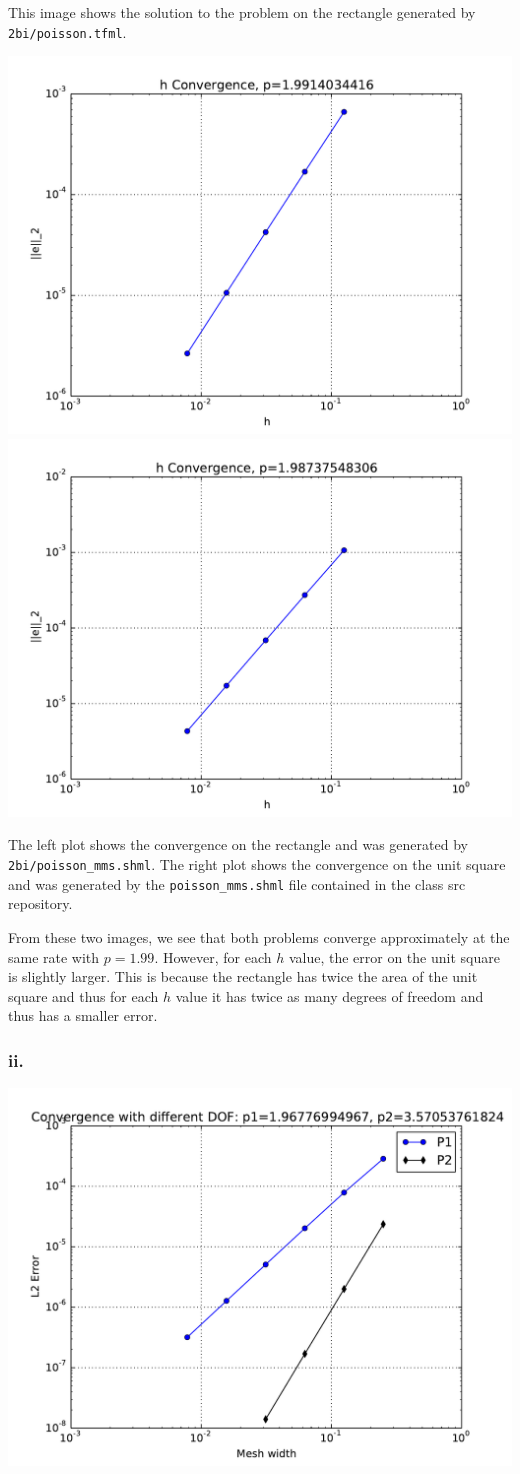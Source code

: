 \documentclass{article}
\begin{document}
This image shows the solution to the problem on the rectangle generated by \verb|2bi/poisson.tfml|.

\includegraphics[width=.5\linewidth]{2biConvergence.pdf}
\includegraphics[width=.5\linewidth]{2biConvergenceSquare.pdf}

The left plot shows the convergence on the rectangle and was generated by \verb|2bi/poisson_mms.shml|. The right plot shows the convergence on the unit square and was generated by the \verb|poisson_mms.shml| file contained in the class src repository.

From these two images, we see that both problems converge approximately at the same rate with $p=1.99$. However, for each $h$ value, the error on the unit square is slightly larger. This is because the rectangle has twice the area of the unit square and thus for each $h$ value it has twice as many degrees of freedom and thus has a smaller error.

\subsubsection*{ii.}
\includegraphics[width=\linewidth]{2biiConvergence.pdf}
\end{document}
